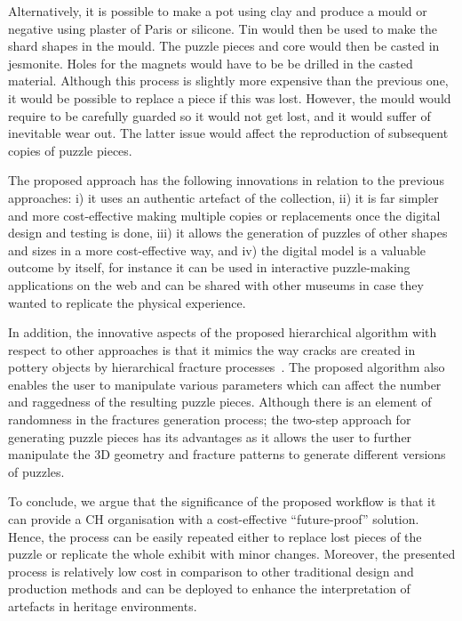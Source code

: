 \documentclass[acmlarge,screen,dvipsnames]{acmart}
\begin{document}
Alternatively, it is possible to make a pot using clay and produce a
mould or negative using plaster of Paris or silicone. Tin would then
be used to make the shard shapes in the mould. The puzzle pieces and
core would then be casted in jesmonite. Holes for the magnets would
have to be be drilled in the casted material. Although this process is
slightly more expensive than the previous one, it would be possible to
replace a piece if this was lost. However, the mould would require to
be carefully guarded so it would not get lost, and it would suffer of
inevitable wear out. The latter issue would affect the reproduction of
subsequent copies of puzzle pieces.

The proposed approach has the following innovations in relation to the
previous approaches: i) it uses an authentic artefact of the
collection, ii) it is far simpler and more cost-effective making
multiple copies or replacements once the digital design and testing is
done, iii) it allows the generation of puzzles of other shapes and
sizes in a more cost-effective way, and iv) the digital model is a
valuable outcome by itself, for instance it can be used in interactive
puzzle-making applications on the web and can be shared with other
museums in case they wanted to replicate the physical experience.

In addition, the innovative aspects of the proposed hierarchical algorithm 
with respect to other approaches is that it mimics the way cracks 
are created in pottery objects
by hierarchical fracture processes~\cite{Shin:2012:ASF:2362402.2362404}. 
The proposed algorithm also enables the user to manipulate various parameters 
which can affect the number and raggedness of the resulting puzzle pieces.
Although there is an element of randomness in the fractures generation 
process; the two-step approach for generating puzzle pieces has its
advantages as it allows the user to further manipulate the 3D geometry and 
fracture patterns to generate different versions of puzzles. 

\greenEnd



To conclude, we argue that the significance of the proposed workflow
is that it can provide a CH organisation with a cost-effective
``future-proof'' solution. Hence, the process can be easily repeated
either to replace lost pieces of the puzzle or replicate the whole
exhibit with minor changes. Moreover, the presented process is
relatively low cost in comparison to other traditional design and
production methods and can be deployed to enhance the interpretation
of artefacts in heritage environments.
\end{document}
